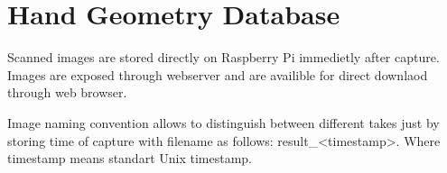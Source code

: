 \section{Hand Geometry Database}
\label{sec:db}
Scanned images are stored directly on Raspberry Pi immedietly after capture. Images are exposed
through webserver and are availible for direct downlaod through web browser.

Image naming convention allows to distinguish between different takes just by storing time of
capture with filename as follows: result\_<timestamp>. Where timestamp means standart Unix timestamp.

